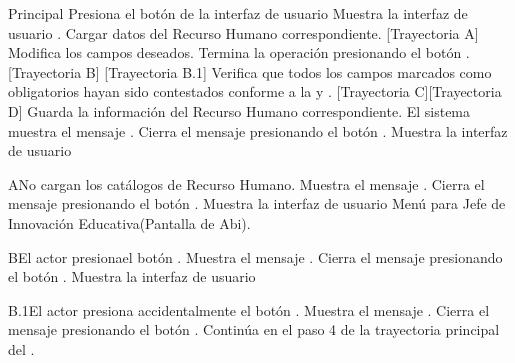\begin{UCtrayectoria}{Principal}
    \UCpaso[\UCactor] Presiona el botón  de la interfaz de usuario 
    \UCpaso Muestra la interfaz de usuario .
    \UCpaso Cargar datos del Recurso Humano correspondiente. [Trayectoria A]
    \UCpaso[\UCactor] Modifica los campos deseados.
    \UCpaso[\UCactor] Termina la operación presionando el botón . [Trayectoria B] [Trayectoria B.1]
    \UCpaso Verifica que todos los campos marcados como obligatorios hayan sido contestados conforme a la  y  . [Trayectoria C][Trayectoria D]
    \UCpaso Guarda la información del Recurso Humano correspondiente.
    \UCpaso El sistema muestra el mensaje .
    \UCpaso[\UCactor] Cierra el mensaje presionando el botón .
    \UCpaso Muestra la interfaz de usuario 
\end{UCtrayectoria}
\begin{UCtrayectoriaA}{A}{No cargan los catálogos de Recurso Humano.}
    \UCpaso Muestra el mensaje .
    \UCpaso[\UCactor] Cierra el mensaje presionando el botón .
\UCpaso Muestra la interfaz de usuario Menú para Jefe de Innovación Educativa(Pantalla de Abi).
\end{UCtrayectoriaA}
\begin{UCtrayectoriaA}{B}{El actor presionael botón .}
    \UCpaso Muestra el mensaje .
    \UCpaso[\UCactor] Cierra el mensaje presionando el botón .
    \UCpaso Muestra la interfaz de usuario 
\end{UCtrayectoriaA}
\begin{UCtrayectoriaA}{B.1}{El actor presiona accidentalmente el botón .}
    \UCpaso Muestra el mensaje .
    \UCpaso[\UCactor] Cierra el mensaje presionando el botón .
    \UCpaso Continúa en el paso 4 de la trayectoria principal del .
\end{UCtrayectoriaA}
